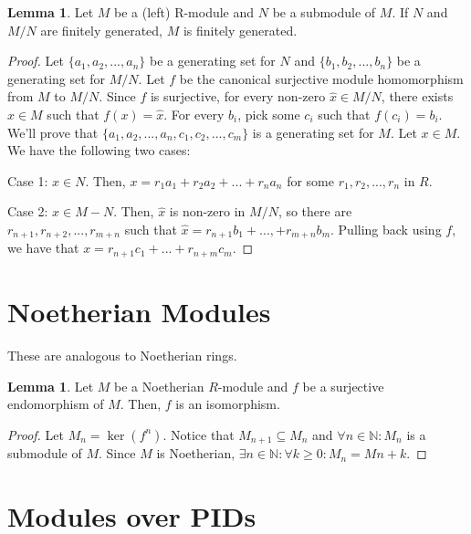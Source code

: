 \documentclass{article}
\theoremstyle{definition}
\newtheorem{lemma}[theorem]{Lemma}
\newcommand{\N}{\mathbb{N}}
\begin{document}
\begin{lemma}
    Let $M$ be a (left) R-module and $N$ be a submodule of $M$. If $N$ and $M/N$ are finitely generated, $M$ is finitely generated.
\end{lemma}
\begin{proof}
    Let $\{a_{1}, a_{2}, ..., a_{n}\}$ be a generating set for $N$ and $\{b_{1}, b_{2}, ..., b_{n}\}$ be a generating set for $M/N$. Let $f$ be the canonical surjective module homomorphism from $M$ to $M/N$. Since $f$ is surjective, for every non-zero $\hat{x} \in M/N$, there exists $x \in M$ such that $f(x) = \hat{x}$. For every $b_{i}$, pick some $c_{i}$ such that $f(c_{i}) = b_{i}$. We'll prove that $\{a_{1},a_{2},...,a_{n},c_{1},c_{2},...,c_{m}\}$ is a generating set for $M$. Let $x \in M$. We have the following two cases:

    Case 1: $x \in N$.
    Then, $x = r_{1}a_{1} + r_{2}a_{2} + ... + r_{n}a_{n}$ for some $r_{1},r_{2}, ..., r_{n}$ in $R$.

    Case 2: $x \in M - N$.
    Then, $\hat{x}$ is non-zero in $M/N$, so there are $r_{n+1}, r_{n+2}, ..., r_{m+n}$ such that $\hat{x} = r_{n+1}b_{1} + ... , + r_{m+n}b_{m}$. Pulling back using $f$, we have that $x = r_{n+1}c_{1} + ... + r_{n + m}c_{m}$.
\end{proof}

\newpage

\section{Noetherian Modules}

These are analogous to Noetherian rings.

\begin{lemma}
    Let $M$ be a Noetherian $R$-module and $f$ be a surjective endomorphism of $M$.
    Then, $f$ is an isomorphism.
\end{lemma}
\begin{proof}
    Let $M_{n} = \ker(f^{n})$. Notice that $M_{n+1} \subseteq M_{n}$ and $\forall n \in \N:
    M_{n}$ is a submodule of $M$. Since $M$ is Noetherian, $\exists n \in \N: \forall k \geq 0:
    M_{n} = M{n + k}$. 
\end{proof}

\newpage

\section{Modules over PIDs}
\end{document}
